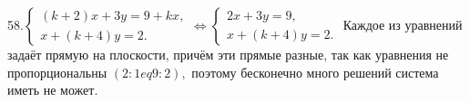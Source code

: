 58.$\begin{cases}
(k+2)x+3y=9+kx,\\
x+(k+4)y=2.
\end{cases}\Leftrightarrow\begin{cases}
2x+3y=9,\\
x+(k+4)y=2.
\end{cases}
$
Каждое из уравнений задаёт прямую на плоскости, причём эти прямые разные, так как уравнения не пропорциональны $(2:1
eq9:2),$ поэтому бесконечно много решений система иметь не может.\\
